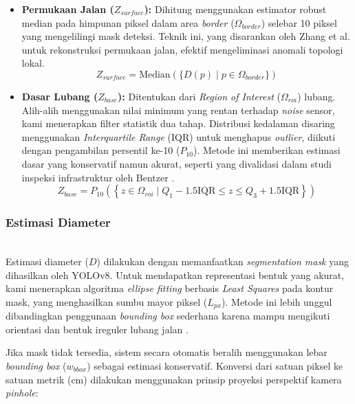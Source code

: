 \documentclass{iopjournal}
\begin{document}
\begin{itemize}
    \item \textbf{Permukaan Jalan ($Z_{surface}$):} Dihitung menggunakan estimator robust median pada himpunan piksel dalam area \textit{border} ($\Omega_{border}$) selebar 10 piksel yang mengelilingi mask deteksi. Teknik ini, yang disarankan oleh Zhang et al. \cite{zhang2020} untuk rekonstruksi permukaan jalan, efektif mengeliminasi anomali topologi lokal.
    \begin{equation}
    Z_{surface} = \text{Median}(\{D(p) \mid p \in \Omega_{border}\})
    \end{equation}
    
    \item \textbf{Dasar Lubang ($Z_{base}$):} Ditentukan dari \textit{Region of Interest} ($\Omega_{roi}$) lubang. Alih-alih menggunakan nilai minimum yang rentan terhadap \textit{noise} sensor, kami menerapkan filter statistik dua tahap. Distribusi kedalaman disaring menggunakan \textit{Interquartile Range} (IQR) untuk menghapus \textit{outlier}, diikuti dengan pengambilan persentil ke-10 ($P_{10}$). Metode ini memberikan estimasi dasar yang konservatif namun akurat, seperti yang divalidasi dalam studi inspeksi infrastruktur oleh Bentzer \cite{bentzer2025}.
    \begin{equation}
    Z_{base} = P_{10}\left(\left\{z \in \Omega_{roi} \mid Q_1 - 1.5\text{IQR} \leq z \leq Q_3 + 1.5\text{IQR}\right\}\right)
    \end{equation}
\end{itemize}

\subsubsection{Estimasi Diameter}
\mbox{}\\
Estimasi diameter ($D$) dilakukan dengan memanfaatkan \textit{segmentation mask} yang dihasilkan oleh YOLOv8. Untuk mendapatkan representasi bentuk yang akurat, kami menerapkan algoritma \textit{ellipse fitting} berbasis \textit{Least Squares} pada kontur mask, yang menghasilkan sumbu mayor piksel ($L_{px}$). Metode ini lebih unggul dibandingkan penggunaan \textit{bounding box} sederhana karena mampu mengikuti orientasi dan bentuk ireguler lubang jalan \cite{singh2021}.

Jika mask tidak tersedia, sistem secara otomatis beralih menggunakan lebar \textit{bounding box} ($w_{bbox}$) sebagai estimasi konservatif. Konversi dari satuan piksel ke satuan metrik (cm) dilakukan menggunakan prinsip proyeksi perspektif kamera \textit{pinhole}:
\end{document}
